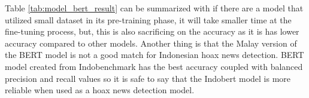 Table \ref{tab:model_bert_result} can be summarized with if there are a model that utilized small dataset in its pre-training phase, it will take smaller time at the fine-tuning process, but, this is also sacrificing on the accuracy as it is has lower accuracy compared to other models. Another thing is that the Malay version of the BERT model is not a good match for Indonesian hoax news detection. BERT model created from Indobenchmark has the best accuracy coupled with balanced precision and recall values so it is safe to say that the Indobert model is more reliable when used as a hoax news detection model.
